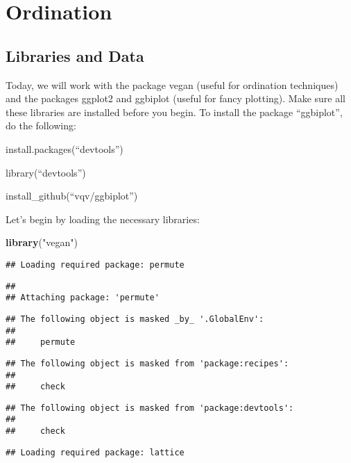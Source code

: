 \documentclass[
]{book}
\newenvironment{Shaded}{\begin{snugshade}}{\end{snugshade}}
\newcommand{\KeywordTok}[1]{\textcolor[rgb]{0.13,0.29,0.53}{\textbf{#1}}}
\newcommand{\NormalTok}[1]{#1}
\newcommand{\StringTok}[1]{\textcolor[rgb]{0.31,0.60,0.02}{#1}}
\begin{document}
\hypertarget{ordination}{%
\chapter{Ordination}\label{ordination}}

\hypertarget{libraries-and-data}{%
\section{Libraries and Data}\label{libraries-and-data}}

Today, we will work with the package vegan (useful for ordination techniques) and the packages ggplot2 and ggbiplot (useful for fancy plotting). Make sure all these libraries are installed before you begin. To install the package ``ggbiplot'', do the following:

install.packages(``devtools'')

library(``devtools'')

install\_github(``vqv/ggbiplot'')

Let's begin by loading the necessary libraries:

\begin{Shaded}
\begin{Highlighting}[]
\KeywordTok{library}\NormalTok{(}\StringTok{"vegan"}\NormalTok{)}
\end{Highlighting}
\end{Shaded}

\begin{verbatim}
## Loading required package: permute
\end{verbatim}

\begin{verbatim}
## 
## Attaching package: 'permute'
\end{verbatim}

\begin{verbatim}
## The following object is masked _by_ '.GlobalEnv':
## 
##     permute
\end{verbatim}

\begin{verbatim}
## The following object is masked from 'package:recipes':
## 
##     check
\end{verbatim}

\begin{verbatim}
## The following object is masked from 'package:devtools':
## 
##     check
\end{verbatim}

\begin{verbatim}
## Loading required package: lattice
\end{verbatim}
\end{document}
